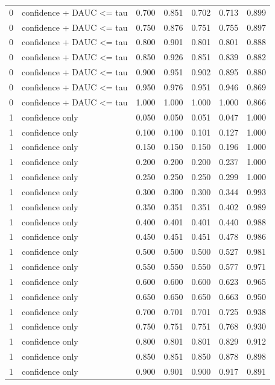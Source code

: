 \begin{tabular}{rlrrrrr}
0 & confidence + DAUC <= tau & 0.700 & 0.851 & 0.702 & 0.713 & 0.899 \\
0 & confidence + DAUC <= tau & 0.750 & 0.876 & 0.751 & 0.755 & 0.897 \\
0 & confidence + DAUC <= tau & 0.800 & 0.901 & 0.801 & 0.801 & 0.888 \\
0 & confidence + DAUC <= tau & 0.850 & 0.926 & 0.851 & 0.839 & 0.882 \\
0 & confidence + DAUC <= tau & 0.900 & 0.951 & 0.902 & 0.895 & 0.880 \\
0 & confidence + DAUC <= tau & 0.950 & 0.976 & 0.951 & 0.946 & 0.869 \\
0 & confidence + DAUC <= tau & 1.000 & 1.000 & 1.000 & 1.000 & 0.866 \\
1 & confidence only & 0.050 & 0.050 & 0.051 & 0.047 & 1.000 \\
1 & confidence only & 0.100 & 0.100 & 0.101 & 0.127 & 1.000 \\
1 & confidence only & 0.150 & 0.150 & 0.150 & 0.196 & 1.000 \\
1 & confidence only & 0.200 & 0.200 & 0.200 & 0.237 & 1.000 \\
1 & confidence only & 0.250 & 0.250 & 0.250 & 0.299 & 1.000 \\
1 & confidence only & 0.300 & 0.300 & 0.300 & 0.344 & 0.993 \\
1 & confidence only & 0.350 & 0.351 & 0.351 & 0.402 & 0.989 \\
1 & confidence only & 0.400 & 0.401 & 0.401 & 0.440 & 0.988 \\
1 & confidence only & 0.450 & 0.451 & 0.451 & 0.478 & 0.986 \\
1 & confidence only & 0.500 & 0.500 & 0.500 & 0.527 & 0.981 \\
1 & confidence only & 0.550 & 0.550 & 0.550 & 0.577 & 0.971 \\
1 & confidence only & 0.600 & 0.600 & 0.600 & 0.623 & 0.965 \\
1 & confidence only & 0.650 & 0.650 & 0.650 & 0.663 & 0.950 \\
1 & confidence only & 0.700 & 0.701 & 0.701 & 0.725 & 0.938 \\
1 & confidence only & 0.750 & 0.751 & 0.751 & 0.768 & 0.930 \\
1 & confidence only & 0.800 & 0.801 & 0.801 & 0.829 & 0.912 \\
1 & confidence only & 0.850 & 0.851 & 0.850 & 0.878 & 0.898 \\
1 & confidence only & 0.900 & 0.901 & 0.900 & 0.917 & 0.891 \\

\end{tabular}
